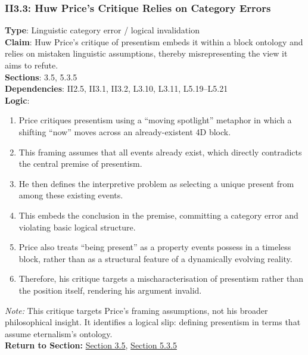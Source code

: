 \documentclass[12pt]{book}
\begin{document}
\subsubsection*{II3.3: Huw Price's Critique Relies on Category Errors}
\label{appendix:II3.3}
\textbf{Type}: Linguistic category error / logical invalidation\\
\textbf{Claim}: Huw Price's critique of presentism embeds it within a block ontology and relies on mistaken linguistic assumptions, thereby misrepresenting the view it aims to refute.\\
\textbf{Sections}: 3.5, 5.3.5\\
\textbf{Dependencies}: II2.5, II3.1, II3.2, L3.10, L3.11, L5.19–L5.21\\
\textbf{Logic}:
\begin{enumerate}
    \item Price critiques presentism using a ``moving spotlight'' metaphor in which a shifting ``now'' moves across an already-existent 4D block.
    \item This framing assumes that all events already exist, which directly contradicts the central premise of presentism.
    \item He then defines the interpretive problem as selecting a unique present from among these existing events.
    \item This embeds the conclusion in the premise, committing a category error and violating basic logical structure.
    \item Price also treats ``being present'' as a property events possess in a timeless block, rather than as a structural feature of a dynamically evolving reality.
    \item Therefore, his critique targets a mischaracterisation of presentism rather than the position itself, rendering his argument invalid.
\end{enumerate}
\textit{Note:} This critique targets Price's framing assumptions, not his broader philosophical insight. It identifies a logical slip: defining presentism in terms that assume eternalism's ontology.\\
\textbf{Return to Section:} \hyperref[sec:3.5]{Section 3.5}, \hyperref[sec:5.3.5]{Section 5.3.5}
\end{document}

